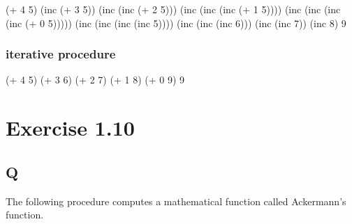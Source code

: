 \documentclass[
]{article}
\newenvironment{Shaded}{}{}
\newcommand{\DecValTok}[1]{\textcolor[rgb]{0.25,0.63,0.44}{#1}}
\newcommand{\NormalTok}[1]{#1}
\newcommand{\OperatorTok}[1]{\textcolor[rgb]{0.40,0.40,0.40}{#1}}
\begin{document}
\begin{Shaded}
\begin{Highlighting}[numbers=left,,]
\NormalTok{(}\OperatorTok{+} \DecValTok{4} \DecValTok{5}\NormalTok{)}
\NormalTok{(inc (}\OperatorTok{+} \DecValTok{3} \DecValTok{5}\NormalTok{))}
\NormalTok{(inc (inc (}\OperatorTok{+} \DecValTok{2} \DecValTok{5}\NormalTok{)))}
\NormalTok{(inc (inc (inc (}\OperatorTok{+} \DecValTok{1} \DecValTok{5}\NormalTok{))))}
\NormalTok{(inc (inc (inc (inc (}\OperatorTok{+} \DecValTok{0} \DecValTok{5}\NormalTok{)))))}
\NormalTok{(inc (inc (inc (inc }\DecValTok{5}\NormalTok{))))}
\NormalTok{(inc (inc (inc }\DecValTok{6}\NormalTok{)))}
\NormalTok{(inc (inc }\DecValTok{7}\NormalTok{))}
\NormalTok{(inc }\DecValTok{8}\NormalTok{)}
\DecValTok{9}
\end{Highlighting}
\end{Shaded}

\hypertarget{iterative-procedure}{%
\subsubsection{iterative procedure}\label{iterative-procedure}}

\begin{Shaded}
\begin{Highlighting}[numbers=left,,]
\NormalTok{(}\OperatorTok{+} \DecValTok{4} \DecValTok{5}\NormalTok{)}
\NormalTok{(}\OperatorTok{+} \DecValTok{3} \DecValTok{6}\NormalTok{)}
\NormalTok{(}\OperatorTok{+} \DecValTok{2} \DecValTok{7}\NormalTok{)}
\NormalTok{(}\OperatorTok{+} \DecValTok{1} \DecValTok{8}\NormalTok{)}
\NormalTok{(}\OperatorTok{+} \DecValTok{0} \DecValTok{9}\NormalTok{)}
\DecValTok{9}
\end{Highlighting}
\end{Shaded}

\hypertarget{exercise-1.10}{%
\section{Exercise 1.10}\label{exercise-1.10}}

\hypertarget{q-9}{%
\subsection{Q}\label{q-9}}

The following procedure computes a mathematical function called
Ackermann's function.
\end{document}
